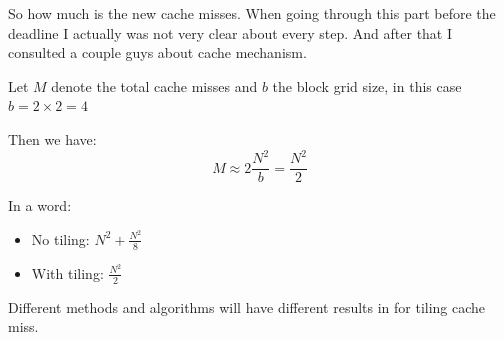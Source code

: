 \documentclass[12pt]{article}
\begin{document}
So how much is the new cache misses. When going through this part
before the deadline I actually was not very clear about every
step. And after that I consulted a couple guys about cache
mechanism. 

Let $M$ denote the total cache misses and $b$ the block grid size, in
this case $b=2\times 2=4$

Then we have:
$$M\approx 2\frac{N^2}{b} = \frac{N^2}{2}$$

In a word:
\begin{itemize}
\item No tiling:  $N^2+\frac{N^2}{8}$ 
\item With tiling: $\frac{N^2}{2}$
\end{itemize}

Different methods and algorithms will have different results in for
tiling cache miss. 
\end{document}
